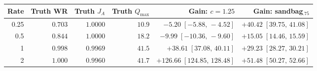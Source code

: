 \begin{tabular}{rrrrrr}
\toprule
Rate & Truth WR & Truth $J_A$ & Truth $Q_{\max}$ & Gain: $c=1.25$ & Gain: sandbag$_{.75}$ \\
\midrule
0.25 & \(0.703\) & \(1.0000\) & \(10.9\) & \(-5.20\;[-5.88,\,-4.52]\) & \(+40.42\;[39.75,\,41.08]\) \\
0.5 & \(0.844\) & \(1.0000\) & \(18.2\) & \(-9.99\;[-10.36,\,-9.60]\) & \(+15.05\;[14.46,\,15.59]\) \\
1 & \(0.998\) & \(0.9969\) & \(41.5\) & \(+38.61\;[37.08,\,40.11]\) & \(+29.23\;[28.27,\,30.21]\) \\
2 & \(1.000\) & \(0.9960\) & \(41.7\) & \(+126.66\;[124.85,\,128.48]\) & \(+51.48\;[50.27,\,52.66]\) \\
\bottomrule
\end{tabular}
